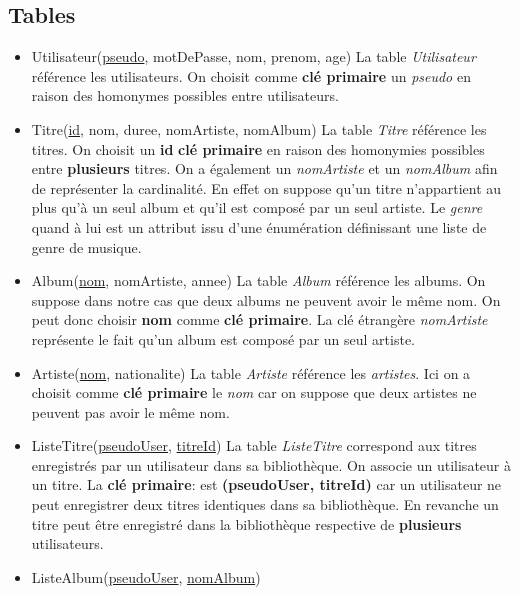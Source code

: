 \documentclass[a4paper,10pt, french]{report}
\begin{document}
  \subsection{Tables}
    \begin{itemize}
      \item Utilisateur(\underline{pseudo}, motDePasse, nom, prenom, age) \newline
        La table \emph{Utilisateur} référence les utilisateurs. On choisit comme \textbf{clé primaire} un \emph{pseudo} en raison des homonymes possibles entre utilisateurs.
      \item Titre(\underline{id}, nom, duree, nomArtiste, nomAlbum) \newline
        La table \emph{Titre} référence les titres. On choisit un \textbf{id} \textbf{clé primaire} en raison des homonymies possibles entre \textbf{plusieurs} titres. On a également un \emph{nomArtiste} et un \emph{nomAlbum} afin de représenter la cardinalité. En effet on suppose qu'un titre n'appartient au plus qu'à un seul album et qu'il est composé par un seul artiste. Le \emph{genre} quand à lui est un attribut issu d'une énumération définissant une liste de genre de musique.
       \item Album(\underline{nom}, nomArtiste, annee) \newline
        La table \emph{Album} référence les albums. On suppose dans notre cas que deux albums ne peuvent avoir le même nom. On peut donc choisir \textbf{nom} comme \textbf{clé primaire}. La clé étrangère \emph{nomArtiste} représente le fait qu'un album est composé par un seul artiste.
      \item Artiste(\underline{nom}, nationalite) \newline
        La table \emph{Artiste} référence les \emph{artistes}. Ici on a choisit comme \textbf{clé primaire} le \emph{nom} car on suppose que deux artistes ne peuvent pas avoir le même nom.
      \item ListeTitre(\underline{pseudoUser}, \underline{titreId}) \newline
        La table \emph{ListeTitre} correspond aux titres enregistrés par un utilisateur dans sa bibliothèque. On associe un utilisateur à un titre. La \textbf{clé primaire}: est \textbf{(pseudoUser, titreId)} car un utilisateur ne peut enregistrer deux titres identiques dans sa bibliothèque. En revanche un titre peut être enregistré dans la bibliothèque respective de \textbf{plusieurs} utilisateurs.
      \item ListeAlbum(\underline{pseudoUser}, \underline{nomAlbum}) \newline

\end{itemize}
\end{document}
